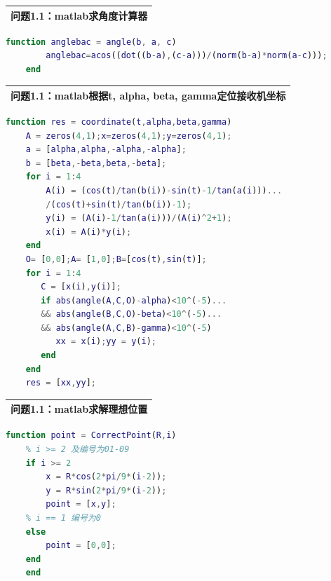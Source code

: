 \documentclass{my_paper}
\begin{document}
\newpage
\begin{table}[H]
    \centering
    \begin{tabular}{|p{14.0cm}|}
    \hline
    \textbf{问题1.1：matlab求角度计算器} \\ %
    \hline
    \end{tabular}
\end{table}
\begin{lstlisting}[language=Matlab]
    function anglebac = angle(b, a, c)
        anglebac=acos((dot((b-a),(c-a)))/(norm(b-a)*norm(a-c)));
    end
\end{lstlisting}

\begin{table}[H]
    \centering
    \begin{tabular}{|p{14.0cm}|}
    \hline
    \textbf{问题1.1：matlab根据t, alpha, beta, gamma定位接收机坐标} \\ %
    \hline
    \end{tabular}
\end{table}


\begin{lstlisting}[language=Matlab]
    function res = coordinate(t,alpha,beta,gamma)
    A = zeros(4,1);x=zeros(4,1);y=zeros(4,1);
    a = [alpha,alpha,-alpha,-alpha];
    b = [beta,-beta,beta,-beta];
    for i = 1:4
        A(i) = (cos(t)/tan(b(i))-sin(t)-1/tan(a(i)))...
        /(cos(t)+sin(t)/tan(b(i))-1);
        y(i) = (A(i)-1/tan(a(i)))/(A(i)^2+1);
        x(i) = A(i)*y(i);
    end
    O= [0,0];A= [1,0];B=[cos(t),sin(t)];
    for i = 1:4
       C = [x(i),y(i)];
       if abs(angle(A,C,O)-alpha)<10^(-5)...
       && abs(angle(B,C,O)-beta)<10^(-5)...
       && abs(angle(A,C,B)-gamma)<10^(-5)
          xx = x(i);yy = y(i); 
       end
    end    
    res = [xx,yy];
\end{lstlisting}


\begin{table}[htbp]
    \centering
    \begin{tabular}{|p{14.0cm}|}
    \hline
    \textbf{问题1.1：matlab求解理想位置} \\ %
    \hline
    \end{tabular}
\end{table}

\begin{lstlisting}[language=Matlab]
    function point = CorrectPoint(R,i)
    % i >= 2 及编号为01-09
    if i >= 2 
        x = R*cos(2*pi/9*(i-2));
        y = R*sin(2*pi/9*(i-2));
        point = [x,y];
    % i == 1 编号为0
    else
        point = [0,0];
    end
    end
\end{lstlisting}
\end{document}
